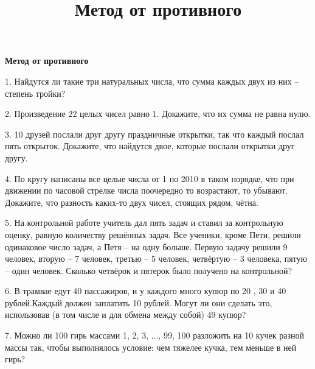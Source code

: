 \centerline{\bf \Huge Метод от противного}
\title{Метод от противного}
1. Найдутся ли такие три натуральных числа, что сумма каждых двух из них – степень тройки?

2. Произведение 22 целых чисел равно 1. Докажите, что их сумма не равна нулю.

3. 10 друзей послали друг другу праздничные открытки, так что каждый послал пять открыток.
Докажите, что найдутся двое, которые послали открытки друг другу.

4. По кругу написаны все целые числа от 1 по 2010 в таком порядке, что при движении по часовой стрелке числа поочередно то возрастают, то убывают.
Докажите, что разность каких-то двух чисел, стоящих рядом, чётна.

5. На контрольной работе учитель дал пять задач и ставил за контрольную оценку, равную количеству решённых задач. Все ученики, кроме Пети, решили одинаковое число задач, а Петя – на одну больше. Первую задачу решили 9 человек, вторую – 7 человек, третью – 5 человек, четвёртую – 3 человека, пятую – один человек. Сколько четвёрок и пятерок было получено на контрольной?

6. В трамвае едут 40 пассажиров, и у каждого много купюр по 20 , 30 и 40 рублей.Каждый должен заплатить 10 рублей.
Могут ли они сделать это, использовав (в том числе и для обмена между собой) 49 купюр?
 
7. Можно ли 100 гирь массами 1, 2, 3, ..., 99, 100 разложить на 10 кучек разной массы так, чтобы выполнялось условие: чем тяжелее кучка, тем меньше в ней гирь?

